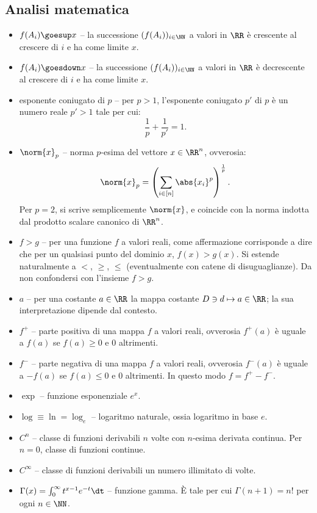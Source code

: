 \begin{multicols*}{2}
    \section*{Analisi matematica}

    \begin{itemize}
        \item $f(A_i) \goesup x$ -- la successione $(f(A_i))_{i \in \NN}$ a valori
        in $\RR$ è crescente al crescere di $i$ e ha come limite $x$.
        \item $f(A_i) \goesdown x$ -- la successione $(f(A_i))_{i \in \NN}$ a valori
        in $\RR$ è decrescente al crescere di $i$ e ha come limite $x$.
        \item esponente coniugato di $p$ -- per $p > 1$, l'esponente coniugato
        $p'$ di $p$ è un numero reale $p' > 1$ tale per cui:
        \[
            \frac{1}{p} + \frac{1}{p'} = 1.
        \]
        \item $\norm{x}_p$ -- norma $p$-esima del vettore $x \in \RR^n$, ovverosia:
        \[
            \norm{x}_p = \left(\sum_{i \in [n]} \abs{x_i}^p\right)^\frac{1}{p}.
        \]
        Per $p = 2$, si scrive semplicemente $\norm{x}$, e coincide con la norma
        indotta dal prodotto scalare canonico di $\RR^n$.
        \item $f > g$ -- per una funzione $f$ a valori reali, come affermazione
        corrisponde a dire che per un qualsiasi punto del dominio $x$, $f(x) > g(x)$. Si estende naturalmente a $<$, $\geq$, $\leq$ (eventualmente con
        catene di disuguaglianze). Da non
        confondersi con l'insieme $f > g$.
        \item $a$ -- per una costante $a \in \RR$ la mappa costante $D \ni d \mapsto a \in \RR$;
        la sua interpretazione dipende dal contesto.
        \item $f^+$ -- parte positiva di una mappa $f$ a valori reali, ovverosia
        $f^+(a)$ è uguale a $f(a)$ se $f(a) \geq 0$ e $0$ altrimenti.
        \item $f^-$ -- parte negativa di una mappa $f$ a valori reali, ovverosia
        $f^-(a)$ è uguale a $-f(a)$ se $f(a) \leq 0$ e $0$ altrimenti. In questo
        modo $f = f^+ - f^-$.
        \item $\exp$ -- funzione esponenziale $e^x$.
        \item $\log \equiv \ln = \log_e$ -- logaritmo naturale, ossia logaritmo in base $e$.
        \item $C^n$ -- classe di funzioni derivabili $n$ volte con $n$-esima derivata continua. Per $n = 0$, classe di funzioni continue.
        \item $C^\infty$ -- classe di funzioni derivabili un numero illimitato di volte.
        \item $\Gamma(x) = \int_0^\infty t^{x-1} e^{-t} \dt$ -- funzione gamma. È tale per cui $\Gamma(n+1) = n!$ per ogni $n \in \NN$. 
    \end{itemize}


\end{multicols*}
